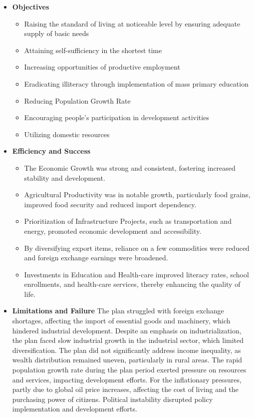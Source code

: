 \begin{itemize}
	
	\item\textbf{Objectives}
	\begin{itemize}
		\item Raising the standard of living at noticeable level by 
		ensuring adequate supply of basic needs
		\item Attaining self-sufficiency in the shortest time
		\item Increasing opportunities of productive employment
		\item Eradicating illiteracy through implementation of mass primary education
		\item Reducing Population Growth Rate
		\item Encouraging people's participation in development activities
		\item Utilizing domestic resources
	\end{itemize}
	
	\item\textbf{Efficiency and Success}
	\begin{itemize}
		\item The Economic Growth was strong and consistent, fostering increased
		 stability and development.
		\item Agricultural Productivity was in notable growth, particularly food 
		grains, improved food security and reduced import dependency.
		\item Prioritization of Infrastructure Projects, such as transportation and 
		energy, promoted economic development and accessibility.
		\item By diversifying export items, reliance on a few commodities were reduced 
		and foreign exchange earnings were broadened.
		\item Investments in Education and Health-care improved literacy rates, school 
		enrollments, and health-care services, thereby enhancing the quality of life.
	\end{itemize}
	
	\item\textbf{Limitations and Failure}
	The plan struggled with foreign exchange shortages, affecting the import of essential goods 
	and machinery, which hindered industrial development. Despite an emphasis on industrialization, 
	the plan faced slow industrial growth in the industrial sector, which limited diversification. 
	The plan did not significantly address income inequality, as wealth distribution remained uneven, 
	particularly in rural areas. The rapid population growth rate during the plan period exerted 
	pressure on resources and services, impacting development efforts. For the inflationary pressures, 
	partly due to global oil price increases, affecting the cost of living and the purchasing power of 
	citizens. Political instability disrupted policy implementation and development efforts.	
	
\end{itemize}


